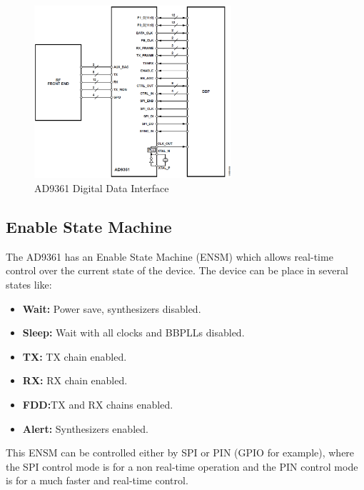 \begin{figure}[htbp]
    \centering
    \includegraphics[width=0.65\textwidth]{./figures/ad9361_digital_interface}
    \caption{ AD9361 Digital Data Interface
    \label{fig:ad9361diginterface}}
\end{figure}


\subsection{Enable State Machine}

The AD9361 has an Enable State Machine (ENSM) which allows real-time control over the current state of the device. The device can be place in several states like:

\begin{itemize}
		\item \textbf{Wait:} Power save, synthesizers disabled.
		\item \textbf{Sleep:} Wait with all clocks and BBPLLs disabled.
		\item \textbf{TX:} TX chain enabled.
		\item \textbf{RX:} RX chain enabled.
		\item \textbf{FDD:}TX and RX chains enabled.
		\item \textbf{Alert:} Synthesizers enabled.
	\end{itemize}
	This ENSM can be controlled either by SPI or PIN (GPIO for example), where the SPI control mode is for a non real-time operation and the PIN control mode is for a much faster and real-time control.
	

